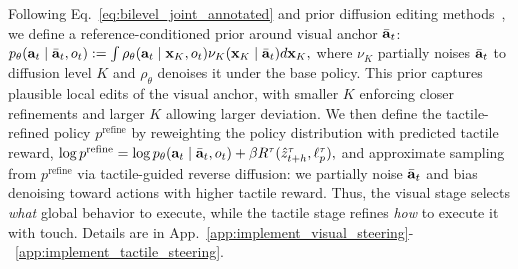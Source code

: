 Following Eq.~\ref{eq:bilevel_joint_annotated} and prior diffusion editing methods~\cite{meng2021sdedit}, we define a reference-conditioned prior around visual anchor $\bar{\mathbf{a}}_{t}$:
$
p_\theta(\mathbf{a}_{t} \mid \bar{\mathbf{a}}_{t}, o_t)
:=
\int
    \rho_\theta(\mathbf{a}_{t} \mid \mathbf{x}_K, o_t)
\nu_K(\mathbf{x}_K \mid \bar{\mathbf{a}}_t)
d\mathbf{x}_K,
$
where $\nu_K$ partially noises $\bar{\mathbf{a}}_t$ to diffusion level $K$ and $\rho_\theta$ denoises it under the base policy. This prior captures plausible local edits of the visual anchor, with smaller $K$ enforcing closer refinements and larger $K$ allowing larger deviation. We then define the tactile-refined policy $p^\textrm{refine}$ by reweighting the policy distribution with predicted tactile reward,
$
\log p^{\mathrm{refine}}
=
\log p_\theta(\mathbf{a}_t \mid \bar{\mathbf{a}}_t, o_t)
+
\beta R^\tau(\hat{z}^\tau_{t+h}, \ell^\tau_p),
$
and approximate sampling from $p^\textrm{refine}$ via tactile-guided reverse diffusion: we partially noise $\bar{\mathbf{a}}_t$ and bias denoising toward actions with higher tactile reward. Thus, the visual stage selects \emph{what} global behavior to execute, while the tactile stage refines \emph{how} to execute it with touch. Details are in App.~\ref{app:implement_visual_steering}-~\ref{app:implement_tactile_steering}.



